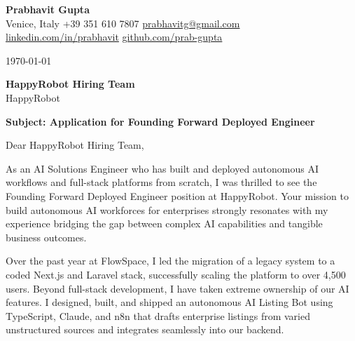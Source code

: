 \documentclass[a4paper,11pt]{article}
\begin{document}
\begin{center}
    {\Huge \textbf{Prabhavit Gupta}} \\[0.5em]
    Venice, Italy \quad \textbullet \quad +39 351 610 7807 \quad \textbullet \quad \href{mailto:prabhavitg@gmail.com}{prabhavitg@gmail.com} \\
    \href{https://www.linkedin.com/in/prabhavit/}{linkedin.com/in/prabhavit} \quad \textbullet \quad \href{https://github.com/prab-gupta}{github.com/prab-gupta}
\end{center}

\vspace{2em}

\today

\textbf{HappyRobot Hiring Team} \\
HappyRobot \\

\vspace{1em}

\textbf{Subject: Application for Founding Forward Deployed Engineer}

\vspace{1em}

Dear HappyRobot Hiring Team,

As an AI Solutions Engineer who has built and deployed autonomous AI workflows and full-stack platforms from scratch, I was thrilled to see the Founding Forward Deployed Engineer position at HappyRobot. Your mission to build autonomous AI workforces for enterprises strongly resonates with my experience bridging the gap between complex AI capabilities and tangible business outcomes.

Over the past year at FlowSpace, I led the migration of a legacy system to a coded Next.js and Laravel stack, successfully scaling the platform to over 4,500 users. Beyond full-stack development, I have taken extreme ownership of our AI features. I designed, built, and shipped an autonomous AI Listing Bot using TypeScript, Claude, and n8n that drafts enterprise listings from varied unstructured sources and integrates seamlessly into our backend. 
\end{document}
